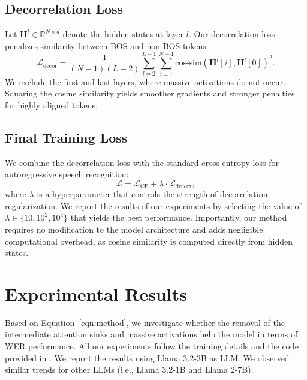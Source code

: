 \documentclass{article}
\begin{document}
\subsection{Decorrelation Loss}
Let $\mathbf{H}^l \in \mathbb{R}^{N \times d}$ denote the hidden states at layer $l$. Our decorrelation loss penalizes similarity between BOS and non-BOS tokens:
\begin{equation}
    \mathcal{L}_{\text{decor}} = \frac{1}{(N-1)(L-2)} \sum_{l=2}^{L-1}\sum_{i=1}^{N-1} 
    \text{cos-sim}(\textbf{H}^l[i], \textbf{H}^l[0])^2.
\end{equation}
We exclude the first and last layers, where massive activations do not occur. Squaring the cosine similarity yields smoother gradients and stronger penalties for highly aligned tokens.


\subsection{Final Training Loss}
We combine the decorrelation loss with the standard cross-entropy loss for autoregressive speech recognition:
\begin{equation}\label{eqn:method}
    \mathcal{L} = \mathcal{L}_{\text{CE}} + \lambda \cdot \mathcal{L}_{\text{decorr}},
\end{equation}
where $\lambda$ is a hyperparameter that controls the strength of decorrelation regularization. We report the results of our experiments by selecting the value of $\lambda \in \{10, 10^2, 10^4\}$ that yields the best performance. Importantly, our method requires no modification to the model architecture and adds negligible computational overhead, as cosine similarity is computed directly from hidden states.

\section{Experimental Results}
\label{sec:results}
Based on Equation~\ref{eqn:method}, we investigate whether the removal of the intermediate attention sinks and massive activations help the model in terms of WER performance. All our experiments follow the training details and the code provided in \cite{cappellazzo2025large}. We report the results using Llama 3.2-3B \cite{dubey2024llama} as LLM. We observed similar trends for other LLMs (i.e., Llama 3.2-1B and Llama 2-7B).
\end{document}
